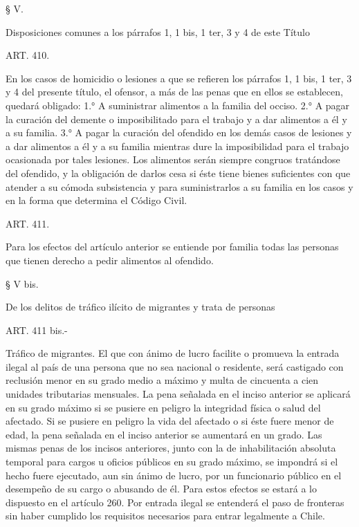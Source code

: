     § V.

    Disposiciones comunes a los párrafos 1, 1 bis, 1 ter, 3 y 4 de este Título



    ART. 410.

    En los casos de homicidio o lesiones a que se refieren los párrafos 1, 1 bis, 1 ter, 3 y 4 del presente título, el ofensor, a más de las penas que en ellos se establecen, quedará obligado:
    1.° A suministrar alimentos a la familia del occiso.
    2.° A pagar la curación del demente o imposibilitado para el trabajo y a dar alimentos a él y a su familia.
    3.° A pagar la curación del ofendido en los demás casos de lesiones y a dar alimentos a él y a su familia mientras dure la imposibilidad para el trabajo ocasionada por tales lesiones.
    Los alimentos serán siempre congruos tratándose del ofendido, y la obligación de darlos cesa si éste tiene bienes suficientes con que atender a su cómoda subsistencia y para suministrarlos a su familia en los casos y en la forma que determina el Código Civil.




    ART. 411.

    Para los efectos del artículo anterior se entiende por familia todas las personas que tienen derecho a pedir alimentos al ofendido.

    § V bis.

    De los delitos de tráfico ilícito de migrantes y trata de personas


    ART. 411 bis.-

    Tráfico de migrantes. El que con ánimo de lucro facilite o promueva la entrada ilegal al país de una persona que no sea nacional o residente, será castigado con reclusión menor en su grado medio a máximo y multa de cincuenta a cien unidades tributarias mensuales.
    La pena señalada en el inciso anterior se aplicará en su grado máximo si se pusiere en peligro la integridad física o salud del afectado.
    Si se pusiere en peligro la vida del afectado o si éste fuere menor de edad, la pena señalada en el inciso anterior se aumentará en un grado.
    Las mismas penas de los incisos anteriores, junto con la de inhabilitación absoluta temporal para cargos u oficios públicos en su grado máximo, se impondrá si el hecho fuere ejecutado, aun sin ánimo de lucro, por un funcionario público en el desempeño de su cargo o abusando de él. Para estos efectos se estará a lo dispuesto en el artículo 260.
    Por entrada ilegal se entenderá el paso de fronteras sin haber cumplido los requisitos necesarios para entrar legalmente a Chile.

